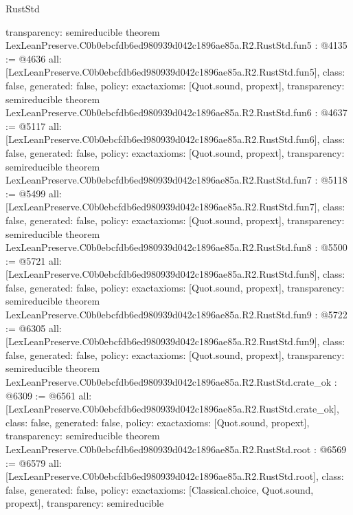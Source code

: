 \begin{lexlean}{RustStd}
\begin{coremodule}
{  transparency: semireducible
}
theorem LexLeanPreserve.C0b0ebcfdb6ed980939d042c1896ae85a.R2.RustStd.fun5 : @4135 := @4636 {
  all: [LexLeanPreserve.C0b0ebcfdb6ed980939d042c1896ae85a.R2.RustStd.fun5],
  class: false,
  generated: false,
  policy: exact{axioms: [Quot.sound, propext]},
  transparency: semireducible
}
theorem LexLeanPreserve.C0b0ebcfdb6ed980939d042c1896ae85a.R2.RustStd.fun6 : @4637 := @5117 {
  all: [LexLeanPreserve.C0b0ebcfdb6ed980939d042c1896ae85a.R2.RustStd.fun6],
  class: false,
  generated: false,
  policy: exact{axioms: [Quot.sound, propext]},
  transparency: semireducible
}
theorem LexLeanPreserve.C0b0ebcfdb6ed980939d042c1896ae85a.R2.RustStd.fun7 : @5118 := @5499 {
  all: [LexLeanPreserve.C0b0ebcfdb6ed980939d042c1896ae85a.R2.RustStd.fun7],
  class: false,
  generated: false,
  policy: exact{axioms: [Quot.sound, propext]},
  transparency: semireducible
}
theorem LexLeanPreserve.C0b0ebcfdb6ed980939d042c1896ae85a.R2.RustStd.fun8 : @5500 := @5721 {
  all: [LexLeanPreserve.C0b0ebcfdb6ed980939d042c1896ae85a.R2.RustStd.fun8],
  class: false,
  generated: false,
  policy: exact{axioms: [Quot.sound, propext]},
  transparency: semireducible
}
theorem LexLeanPreserve.C0b0ebcfdb6ed980939d042c1896ae85a.R2.RustStd.fun9 : @5722 := @6305 {
  all: [LexLeanPreserve.C0b0ebcfdb6ed980939d042c1896ae85a.R2.RustStd.fun9],
  class: false,
  generated: false,
  policy: exact{axioms: [Quot.sound, propext]},
  transparency: semireducible
}
theorem LexLeanPreserve.C0b0ebcfdb6ed980939d042c1896ae85a.R2.RustStd.crate_ok : @6309 := @6561 {
  all: [LexLeanPreserve.C0b0ebcfdb6ed980939d042c1896ae85a.R2.RustStd.crate_ok],
  class: false,
  generated: false,
  policy: exact{axioms: [Quot.sound, propext]},
  transparency: semireducible
}
theorem LexLeanPreserve.C0b0ebcfdb6ed980939d042c1896ae85a.R2.RustStd.root : @6569 := @6579 {
  all: [LexLeanPreserve.C0b0ebcfdb6ed980939d042c1896ae85a.R2.RustStd.root],
  class: false,
  generated: false,
  policy: exact{axioms: [Classical.choice, Quot.sound, propext]},
  transparency: semireducible
}


\end{coremodule}
\end{lexlean}

